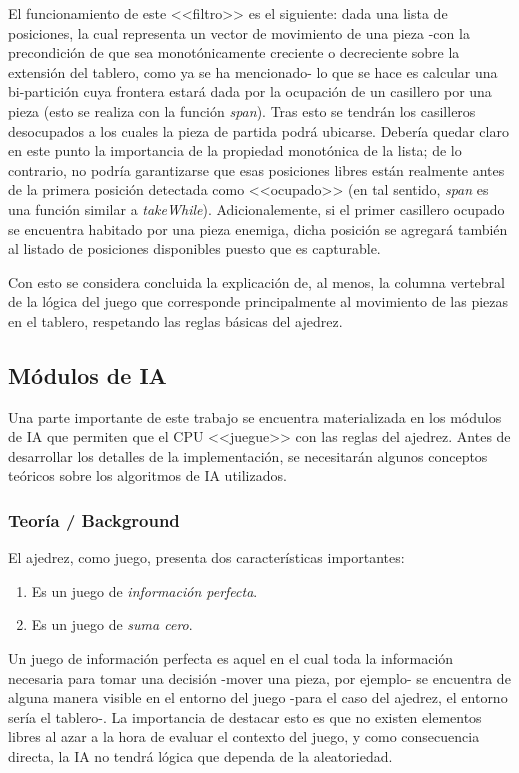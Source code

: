 \documentclass{llncs}
\begin{document}
El funcionamiento de este <<filtro>> es el siguiente: dada una lista de posiciones, la cual representa un vector de movimiento de una pieza -con la precondición de que sea monotónicamente creciente o decreciente sobre la extensión del tablero, como ya se ha mencionado- lo que se hace es calcular una bi-partición cuya frontera estará dada por la ocupación de un casillero por una pieza (esto se realiza con la función \textit{span}).  Tras esto se tendrán los casilleros desocupados a los cuales la pieza de partida podrá ubicarse. Debería quedar claro en este punto la importancia de la propiedad monotónica de la lista; de lo contrario, no podría garantizarse que esas posiciones libres están realmente antes de la primera posición detectada como <<ocupado>> (en tal sentido, \textit{span} es una función similar a \textit{takeWhile}).
Adicionalemente, si el primer casillero ocupado se encuentra habitado por una pieza enemiga, dicha posición se agregará también al listado de posiciones disponibles puesto que es capturable.

Con esto se considera concluida la explicación de, al menos, la columna vertebral de la lógica del juego que corresponde principalmente al movimiento de las piezas en el tablero, respetando las reglas básicas del ajedrez.


\subsection{Módulos de IA}

Una parte importante de este trabajo se encuentra materializada en los módulos de IA que permiten que el CPU <<juegue>> con las reglas del ajedrez. Antes de desarrollar los detalles de la implementación, se necesitarán algunos conceptos teóricos sobre los algoritmos de IA utilizados.

\subsubsection{ Teoría / Background }

El ajedrez, como juego, presenta dos características importantes:

\begin{enumerate}
  \item Es un juego de \textit{información perfecta}.
  \item Es un juego de \textit{suma cero}.
\end{enumerate}

Un juego de información perfecta es aquel en el cual toda la información necesaria para tomar una decisión -mover una pieza, por ejemplo- se encuentra de alguna manera visible en el entorno del juego -para el caso del ajedrez, el entorno sería el tablero-. La importancia de destacar esto es que no existen elementos libres al azar a la hora de evaluar el contexto del juego, y como consecuencia directa, la IA no tendrá lógica que dependa de la aleatoriedad.
\end{document}
